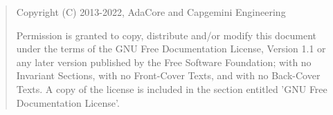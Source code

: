 \bigskip
\begin{quote}
   Copyright (C) 2013-2022, AdaCore and Capgemini Engineering

   Permission is granted to copy, distribute and/or modify this document
   under the terms of the GNU Free Documentation License, Version 1.1
   or any later version published by the Free Software Foundation;
   with no Invariant Sections, with no Front-Cover Texts, and with no
   Back-Cover Texts.
   A copy of the license is included in the section entitled 'GNU
   Free Documentation License'.
\end{quote}
\bigskip
